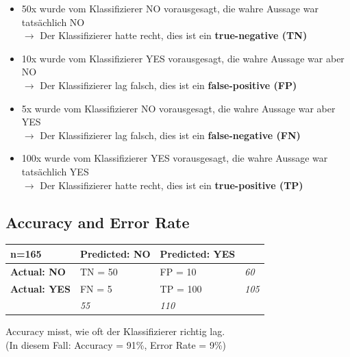 \documentclass[a4paper]{article}
\begin{document}
		\begin{itemize}
			\item 50x wurde vom Klassifizierer NO vorausgesagt, die wahre Aussage war tatsächlich NO \\
				$\rightarrow$ Der Klassifizierer hatte recht, dies ist ein \textbf{true-negative (TN)}
			\item 10x wurde vom Klassifizierer YES vorausgesagt, die wahre Aussage war aber NO \\
				$\rightarrow$ Der Klassifizierer lag falsch, dies ist ein \textbf{false-positive (FP)}
			\item 5x wurde vom Klassifizierer NO vorausgesagt, die wahre Aussage war aber YES \\
				$\rightarrow$ Der Klassifizierer lag falsch, dies ist ein \textbf{false-negative (FN)}
			\item 100x wurde vom Klassifizierer YES vorausgesagt, die wahre Aussage war tatsächlich YES \\
				$\rightarrow$ Der Klassifizierer hatte recht, dies ist ein \textbf{true-positive (TP)}
		\end{itemize}
	
		\subsection{Accuracy and Error Rate}
		
		\begin{table}[htb!]
			\begin{tabular}{l|l|l|l}
				\cline{2-3}
				n=165                                      & \textbf{Predicted: NO} & \textbf{Predicted: YES} &                                   \\ \hline
				\multicolumn{1}{|l|}{\textbf{Actual: NO}}  & TN = 50                & FP = 10                 & \multicolumn{1}{l|}{\textit{60}}  \\ \hline
				\multicolumn{1}{|l|}{\textbf{Actual: YES}} & FN = 5                 & TP = 100                & \multicolumn{1}{l|}{\textit{105}} \\ \hline
				& \textit{55}            & \textit{110}            &                                   \\ \cline{2-3}
			\end{tabular}
		\end{table}
	\noindent
		Accuracy misst, wie oft der Klassifizierer richtig lag.\\
		(In diesem Fall: Accuracy = 91\%, Error Rate = 9\%)\\
		
\end{document}
